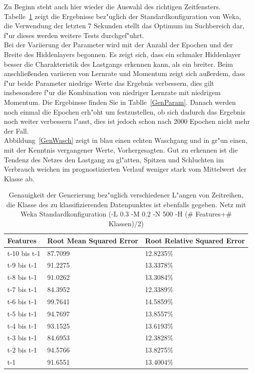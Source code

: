 Zu Beginn steht auch hier wieder die Auswahl des richtigen Zeitfensters. Tabelle~\ref{GenZeit} zeigt die Ergebnisse bez"uglich der Standardkonfiguration von Weka, die Verwendung der letzten 7 Sekunden stellt das Optimum im Suchbereich dar, f"ur dieses werden weitere Tests durchgef"uhrt.\\

Bei der Variierung der Parameter wird mit der Anzahl der Epochen und der Breite des Hiddenlayers begonnen. Es zeigt sich, dass ein schmaler Hiddenlayer besser die Charakteristik des Lastgangs erkennen kann, als ein breiter. Beim anschlie{\ss}enden variieren von Lernrate und Momentum zeigt sich au{\ss}erdem, dass f"ur beide Parameter niedrige Werte das Ergebnis verbessern, dies gilt insbesondere f"ur die Kombination von niedriger Lernrate mit niedrigem Momentum. Die Ergebinsse finden Sie in Tablle~\ref{GenParam}. 
Danach werden noch einmal die Epochen erh"oht um festzustellen, ob sich dadurch das Ergebnis noch weiter verbessern l"asst, dies ist jedoch schon nach 2000 Epochen nicht mehr der Fall. \\

Abbildung~\ref{GenWasch} zeigt in blau einen echten Waschgang und in gr"un einen, mit der Kenntnis vergangener Werte, Vorhergesagten. Gut zu erkennen ist die Tendenz des Netzes den Lastgang zu gl"atten, Spitzen und Schluchten im Verbrauch weichen im prognostizierten Verlauf weniger stark vom Mittelwert der Klasse ab.

\begin{table}[h]
\begin{tabular}{l|p{4cm}|p{4cm}}
Features & Root Mean Squared Error & Root Relative Squared Error \\
\hline
t-10 bis t-1 & 87.7099 & 12.8235\% \\
t-9 bis t-1 & 91.2275 & 13.3378\% \\
t-8 bis t-1 & 91.0262 & 13.3084\% \\
t-7 bis t-1 & 84.3952 & 12.3389\% \\
t-6 bis t-1 & 99.7641 & 14.5859\% \\
t-5 bis t-1 & 94.7697 & 13.8557\% \\
t-4 bis t-1 & 93.1525 & 13.6193\% \\
t-3 bis t-1 & 84.6953 & 12.3828\% \\
t-2 bis t-1 & 94.5766 & 13.8275\% \\
t-1 & 91.6551 & 13.4004\% 
\end{tabular}
\caption[Generierung mit Zeitreihen Features]{Genauigkeit der Generierung bez"uglich verschiedener L"angen von Zeitreihen, die Klasse des zu klassifizierenden Datenpunktes ist ebenfalls gegeben. Netz mit Weka Standardkonfiguration (-L 0.3 -M 0.2 -N 500 -H (\# Features+\# Klassen)/2)}
\label{GenZeit}
\end{table}

